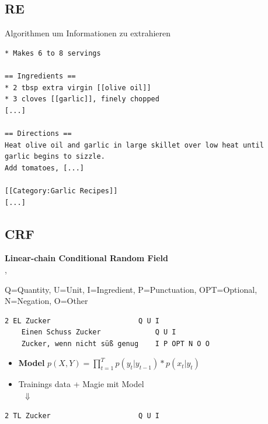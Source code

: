 \documentclass[12pt]{beamer}
\newcommand{\myCite}[1]{{\scriptsize\parencite{#1}}}
\begin{document}
\subsection{RE}
\begin{frame}[fragile]{Algorithmen um Informationen zu extrahieren}
	\begin{center}
		\myCite{REgutGenug}
	\end{center}

	\begin{lstlisting}[frame=single, basicstyle=\footnotesize\ttfamily, caption={Beispiel Rezept von \newline http://recipes.wikia.com/wiki/Recipes\_Wiki}]
* Makes 6 to 8 servings

== Ingredients ==
* 2 tbsp extra virgin [[olive oil]]
* 3 cloves [[garlic]], finely chopped
[...]

== Directions ==
Heat olive oil and garlic in large skillet over low heat until
garlic begins to sizzle.
Add tomatoes, [...]

[[Category:Garlic Recipes]]
[...]
	\end{lstlisting}
\end{frame}

\subsection{CRF}
\begin{frame}[fragile]
	\begin{center}
		\textbf{Linear-chain Conditional Random Field} \\
		\myCite{CRFIntroduction}, \myCite{CRFZeit}
	\end{center}
	
	{\footnotesize Q=Quantity, U=Unit, I=Ingredient, P=Punctuation, OPT=Optional, N=Negation, O=Other}
	\begin{lstlisting}[frame=single, basicstyle=\footnotesize\ttfamily, caption={training data}]
	2 EL Zucker                     Q U I
	Einen Schuss Zucker             Q U I
	Zucker, wenn nicht süß genug    I P OPT N O O
	\end{lstlisting}
	
	\begin{itemize}
		\item \textbf{Model} $p(X,Y) = \prod_{t=1}^T p(y_t|y_{t-1}) * p(x_t|y_t)$
		\item Trainings data + Magie mit Model \\
		\quad \quad \quad \quad \quad \quad \ \textbf{$\Downarrow$}
	\end{itemize}
	
	\begin{lstlisting}[frame=single, basicstyle=\footnotesize\ttfamily, caption={Labeling}]
		2 TL Zucker                     Q U I
	\end{lstlisting}
\end{frame}
\end{document}
